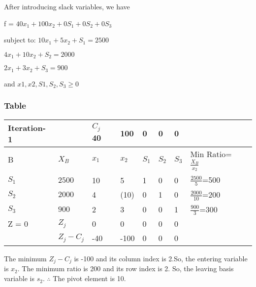 \documentclass{beamer}
\begin{document}
\begin{frame}
After introducing slack variables, we have\newline

f = $40x_{1}+ 100x_{2} +0S_{1} + 0S_{2} + 0S_{3}$\newline

subject to:
\centering
$10x_{1} + 5x_{2} + S_{1} = 2500$\newline

$4x_{1} + 10x_{2} + S_{2} = 2000$\newline

$2x_{1} + 3x_{2} + S_{3} = 900$\newline

and $x{1},x{2},S{1},S_{2},S_{3}\geq0$\newline


\end{frame}
\begin{frame}
\frametitle{Table}
\begin{table}
\begin{tabular}{l l l l l l l l l }
\toprule
\textbf{Iteration-1} & \textbf{} & \textbf{$C_{j}$} \textbf{40} & \textbf{100} & \textbf{0} & \textbf{0} & \textbf{0} & \textbf{       }\\

\midrule
B & $X_{B}$ & $x_{1}$ & $x_{2}$ & $S_{1}$ & $S_{2}$ & $S_{3}$ & Min Ratio=$\frac{X_{B}}{x_{2}}$\\
$S_{1}$ & $2500$ & 10 & 5 & 1 & 0 & 0 & $\frac{2500}{5}$=500\\

$S_{2}$ & $2000$ & 4 & (10) & 0 & 1 & 0 & $\frac{2000}{10}$=200\\

$S_{3}$ & $900$ & 2 & 3 & 0 & 0 & 1 & $\frac{900}{3}$=300\\

Z = 0 & $Z_{j}$  & 0 & 0 & 0 & 0 & 0 &  \\
\bottomrule

   & $Z_{j}-C_{j}$ & -40 & -100 & 0 & 0 & 0 &  \\
\end{tabular}

\end{table}\newline

The minimum $Z_{j}-C_{j}$ is -100 and its column index is 2.So, the entering variable is $x_{2}$.\newline
The minimum ratio is 200 and its row index is 2. So, the leaving basis variable is $s_{2}$.\newline
$\therefore$ The pivot element is 10.

\end{frame}
\end{document}
